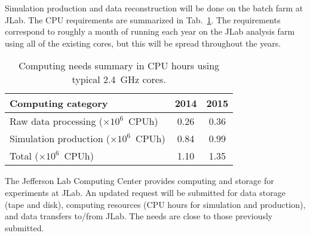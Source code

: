 Simulation production and data reconstruction will be done on the batch farm at JLab. The CPU requirements 
are summarized in Tab.~\ref{tab:computing}. The requirements correspond to roughly a month of running
each year on the JLab analysis farm using all of the existing cores, but this will be spread throughout the
years.
\begin{table}[ht]
\centering
\begin{tabular}{|l|c|c|}
\hline
Computing category & 2014& 2015 \\
\hline
Raw data processing ($\times 10^{6}$~CPUh)  & 0.26 & 0.36 \\
Simulation production ($\times 10^{6}$~CPUh) & 0.84 & 0.99 \\
\hline
Total ($\times 10^{6}$~CPUh) & 1.10 & 1.35 \\
\hline
\end{tabular}
\caption{{\small Computing needs summary in CPU hours using typical 2.4~GHz cores.}}
\label{tab:computing}
\end{table}

The Jefferson Lab Computing Center provides computing and storage for experiments at JLab. 
An updated request will be submitted for data storage (tape and disk), computing resources (CPU hours for simulation and production), and data transfers to/from JLab.
The needs are close to those previously submitted.
